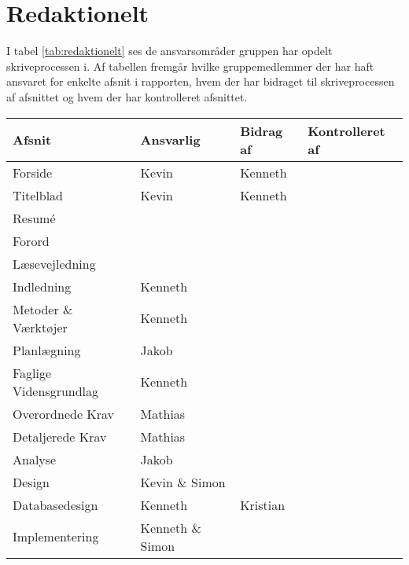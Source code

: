 \section{Redaktionelt}
I tabel \ref{tab:redaktionelt} ses de ansvarsområder gruppen har opdelt skriveprocessen i. Af tabellen fremgår hvilke gruppemedlemmer der har haft ansvaret for enkelte afsnit i rapporten, hvem der har bidraget til skriveprocessen af afsnittet og hvem der har kontrolleret afsnittet. 

\begin{table}[H] %
    \begin{tabularx}{\textwidth}{|p{7cm}|X|X|X|}
        \hline
        \textbf{Afsnit}                     &  \textbf{Ansvarlig}  & \textbf{Bidrag af} & \textbf{Kontrolleret af}\\
        \hline
        Forside                             & Kevin & Kenneth &  \\
        \hline
        Titelblad                           & Kevin & Kenneth &  \\
        \hline
        Resumé                              &  &  &  \\
        \hline
        Forord                              &  &  &  \\
        \hline
        Læsevejledning                      &  &  &  \\
        \hline
        Indledning                          & Kenneth &  &  \\
        \hline
        Metoder \& Værktøjer                & Kenneth &  &  \\
        \hline
        Planlægning                         & Jakob &  &  \\
        \hline
        Faglige Vidensgrundlag              & Kenneth &  &  \\
        \hline
        Overordnede Krav                    & Mathias &  &  \\
        \hline
        Detaljerede Krav                    & Mathias &  &  \\
        \hline
        Analyse                             & Jakob &  &  \\
        \hline
        Design                              & Kevin \& Simon &  &  \\
        \hline
        Databasedesign                      & Kenneth & Kristian &  \\
        \hline
        Implementering                      & Kenneth \& Simon &  &  \\

\end{tabularx}
\end{table}
